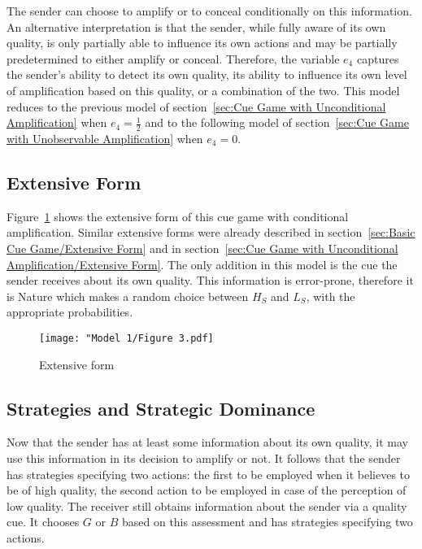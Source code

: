 \documentclass[a4paper,12pt]{article}
\numberwithin{equation}{section}
\begin{document}
The sender can choose to amplify or to conceal conditionally on this information. An alternative interpretation is that the sender, while fully aware of its own quality, is only partially able to influence its own actions and may be partially predetermined to either amplify or conceal. Therefore, the variable $e_{4}$ captures the sender's ability to detect its own quality, its ability to influence its own level of amplification based on this quality, or a combination of the two. This model reduces to the previous model of section~\ref{sec:Cue Game with Unconditional Amplification} when $e_{4} = \frac{1}{2}$ and to the following model of section~\ref{sec:Cue Game with Unobservable Amplification} when $e_{4} = 0$.


\subsection{Extensive Form}
\label{sec:Cue Game with Conditional Amplification/Extensive Form}

Figure~\ref{fig:Model 1/Figure 3.pdf} shows the extensive form of this cue game with conditional amplification. Similar extensive forms were already described in section~\ref{sec:Basic Cue Game/Extensive Form} and in section~\ref{sec:Cue Game with Unconditional Amplification/Extensive Form}. The only addition in this model is the cue the sender receives about its own quality. This information is error-prone, therefore it is Nature which makes a random choice between $H_{S}$ and $L_{S}$, with the appropriate probabilities.

\begin{figure}[h]
\begin{center}
\leavevmode
\texttt{[image: "Model 1/Figure 3.pdf]}
\caption{Extensive form}
\label{fig:Model 1/Figure 3.pdf}
\end{center}
\end{figure}


\subsection{Strategies and Strategic Dominance}
\label{sec:Strategic Dominance}

Now that the sender has at least some information about its own quality, it may use this information in its decision to amplify or not. It follows that the sender has strategies specifying two actions: the first to be employed when it believes to be of high quality, the second action to be employed in case of the perception of low quality. The receiver still obtains information about the sender via a quality cue. It chooses $G$ or $B$ based on this assessment and has strategies specifying two actions.
\end{document}
